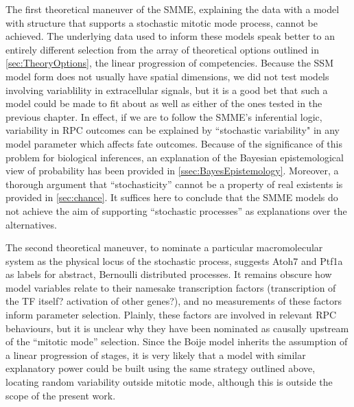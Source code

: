 \documentclass{ut-thesis}
\begin{document}
\begin{NoHyper}
The first theoretical maneuver of the SMME, explaining the data with a model with structure that supports a stochastic mitotic mode process, cannot be achieved. The underlying data used to inform these models speak better to an entirely different selection from the array of theoretical options outlined in \autoref{sec:TheoryOptions}, the linear progression of competencies. Because the SSM model form does not usually have spatial dimensions, we did not test models involving variablility in extracellular signals, but it is a good bet that such a model could be made to fit about as well as either of the ones tested in the previous chapter. In effect, if we are to follow the SMME's inferential logic, variability in RPC outcomes can be explained by ``stochastic variability" in any model parameter which affects fate outcomes. Because of the significance of this problem for biological inferences, an explanation of the Bayesian epistemological view of probability has been provided in \autoref{ssec:BayesEpistemology}. Moreover, a thorough argument that ``stochasticity'' cannot be a property of real existents is provided in \autoref{sec:chance}. It suffices here to conclude that the SMME models do not achieve the aim of supporting ``stochastic processes'' as explanations over the alternatives.

The second theoretical maneuver, to nominate a particular macromolecular system as the physical locus of the stochastic process, suggests Atoh7 and Ptf1a as labels for abstract, Bernoulli distributed processes. It remains obscure how model variables relate to their namesake transcription factors (transcription of the TF itself? activation of other genes?), and no measurements of these factors inform parameter selection. Plainly, these factors are involved in relevant RPC behaviours, but it is unclear why they have been nominated as causally upstream of the ``mitotic mode'' selection. Since the Boije model inherits the assumption of a linear progression of stages, it is very likely that a model with similar explanatory power could be built using the same strategy outlined above, locating random variability outside mitotic mode, although this is outside the scope of the present work.


\end{NoHyper}
\end{document}
